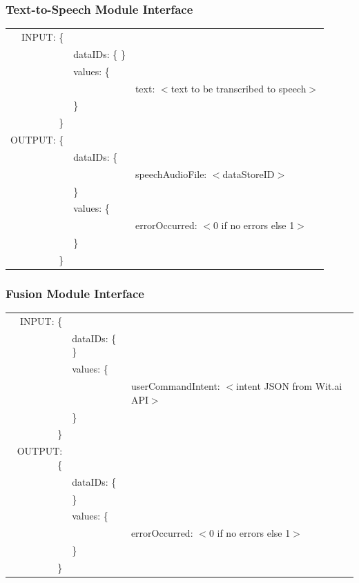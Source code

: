 \documentclass[onecolumn, draftclsnofoot,10pt, compsoc]{IEEEtran}
\begin{document}
         \subsubsection{Text-to-Speech Module Interface}
            \begin{tabular}[t]{r l p{4.5in}}
                INPUT: \{ & & \\
                & dataIDs: \{ \} & \\
                & values: \{ & \\
                & & text: $<$text to be transcribed to speech$>$ \\
                & \} & \\
                \} & & \\
                OUTPUT: \{ & & \\
                & dataIDs: \{ & \\
                & & speechAudioFile: $<$dataStoreID$>$ \\
                & \} & \\
                & values: \{ & \\
                & & errorOccurred: $<$0 if no errors else 1$>$ \\
                & \} & \\
                \} & & \\
            \end{tabular}

        \subsubsection{Fusion Module Interface}
            \begin{tabular}[t]{r l p{4.5in}}
                INPUT: \{ & & \\
                & dataIDs: \{ \} & \\
                & values: \{ & \\
                & & userCommandIntent: $<$intent JSON from Wit.ai API$>$ \\
                & \} & \\
                \} & & \\
                OUTPUT: \{ & & \\
                & dataIDs: \{ & \\
                & \} & \\
                & values: \{ & \\
                & & errorOccurred: $<$0 if no errors else 1$>$ \\
                & \} & \\
                \} & & \\
            \end{tabular}
\end{document}
